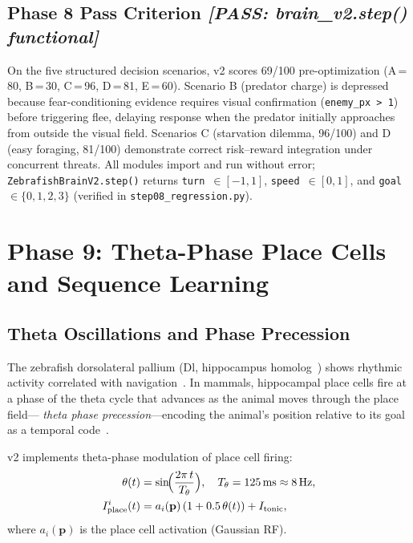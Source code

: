 \documentclass[11pt,a4paper]{article}
\begin{document}
\subsection{Phase 8 Pass Criterion \textit{[PASS: brain\_v2.step() functional]}}

On the five structured decision scenarios, v2 scores 69/100 pre-optimization
(A\,=\,80, B\,=\,30, C\,=\,96, D\,=\,81, E\,=\,60).
Scenario B (predator charge) is depressed because fear-conditioning
evidence requires visual confirmation (\texttt{enemy\_px > 1}) before
triggering flee, delaying response when the predator initially
approaches from outside the visual field.
Scenarios C (starvation dilemma, 96/100) and D (easy foraging, 81/100)
demonstrate correct risk--reward integration under concurrent threats.
All modules import and run without error; \texttt{ZebrafishBrainV2.step()} returns
\texttt{turn}~$\in [-1, 1]$, \texttt{speed}~$\in [0, 1]$, and \texttt{goal}~$\in \{0,1,2,3\}$
(verified in \texttt{step08\_regression.py}).

\section{Phase 9: Theta-Phase Place Cells and Sequence Learning}\label{sec:phase9}

\subsection{Theta Oscillations and Phase Precession}

The zebrafish dorsolateral pallium (Dl, hippocampus homolog~\cite{broglio2015})
shows rhythmic activity correlated with navigation~\cite{wolf2009}.
In mammals, hippocampal place cells fire at a phase of the theta cycle
that advances as the animal moves through the place field---
\emph{theta phase precession}---encoding the animal's position relative to
its goal as a temporal code~\cite{okeefe1993}.

v2 implements theta-phase modulation of place cell firing:
\begin{equation}\label{eq:theta}
\begin{aligned}
  \theta(t) &= \sin\!\Bigl(\frac{2\pi\,t}{T_\theta}\Bigr),
  \quad T_\theta = 125\,\text{ms} \approx 8\,\text{Hz}, \\
  I_\text{place}^i(t) &= a_i(\mathbf{p})\,(1 + 0.5\,\theta(t)) + I_\text{tonic},
\end{aligned}
\end{equation}
where $a_i(\mathbf{p})$ is the place cell activation (Gaussian RF).
\end{document}
